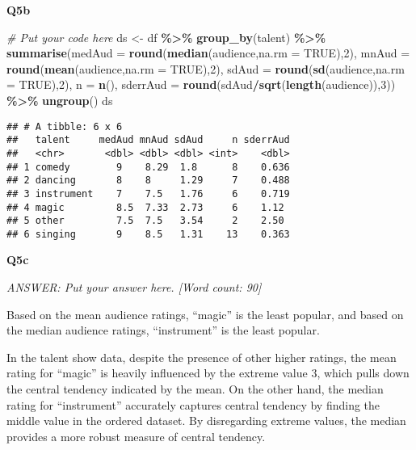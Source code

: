 \documentclass[
]{article}
\newenvironment{Shaded}{\begin{snugshade}}{\end{snugshade}}
\newcommand{\AttributeTok}[1]{\textcolor[rgb]{0.13,0.29,0.53}{#1}}
\newcommand{\CommentTok}[1]{\textcolor[rgb]{0.56,0.35,0.01}{\textit{#1}}}
\newcommand{\ConstantTok}[1]{\textcolor[rgb]{0.56,0.35,0.01}{#1}}
\newcommand{\DecValTok}[1]{\textcolor[rgb]{0.00,0.00,0.81}{#1}}
\newcommand{\FunctionTok}[1]{\textcolor[rgb]{0.13,0.29,0.53}{\textbf{#1}}}
\newcommand{\NormalTok}[1]{#1}
\newcommand{\OtherTok}[1]{\textcolor[rgb]{0.56,0.35,0.01}{#1}}
\newcommand{\SpecialCharTok}[1]{\textcolor[rgb]{0.81,0.36,0.00}{\textbf{#1}}}
\begin{document}
\textbf{Q5b}

\begin{Shaded}
\begin{Highlighting}[]
\CommentTok{\# Put your code here}
\NormalTok{ds }\OtherTok{\textless{}{-}}\NormalTok{ df }\SpecialCharTok{\%\textgreater{}\%}
  \FunctionTok{group\_by}\NormalTok{(talent) }\SpecialCharTok{\%\textgreater{}\%}
  \FunctionTok{summarise}\NormalTok{(}\AttributeTok{medAud =} \FunctionTok{round}\NormalTok{(}\FunctionTok{median}\NormalTok{(audience,}\AttributeTok{na.rm =} \ConstantTok{TRUE}\NormalTok{),}\DecValTok{2}\NormalTok{),}
            \AttributeTok{mnAud =} \FunctionTok{round}\NormalTok{(}\FunctionTok{mean}\NormalTok{(audience,}\AttributeTok{na.rm =} \ConstantTok{TRUE}\NormalTok{),}\DecValTok{2}\NormalTok{),}
            \AttributeTok{sdAud =} \FunctionTok{round}\NormalTok{(}\FunctionTok{sd}\NormalTok{(audience,}\AttributeTok{na.rm =} \ConstantTok{TRUE}\NormalTok{),}\DecValTok{2}\NormalTok{),}
            \AttributeTok{n =} \FunctionTok{n}\NormalTok{(),}
            \AttributeTok{sderrAud =} \FunctionTok{round}\NormalTok{(sdAud}\SpecialCharTok{/}\FunctionTok{sqrt}\NormalTok{(}\FunctionTok{length}\NormalTok{(audience)),}\DecValTok{3}\NormalTok{)) }\SpecialCharTok{\%\textgreater{}\%}
  \FunctionTok{ungroup}\NormalTok{()}
\NormalTok{ds}
\end{Highlighting}
\end{Shaded}

\begin{verbatim}
## # A tibble: 6 x 6
##   talent     medAud mnAud sdAud     n sderrAud
##   <chr>       <dbl> <dbl> <dbl> <int>    <dbl>
## 1 comedy        9    8.29  1.8      8    0.636
## 2 dancing       8    8     1.29     7    0.488
## 3 instrument    7    7.5   1.76     6    0.719
## 4 magic         8.5  7.33  2.73     6    1.12 
## 5 other         7.5  7.5   3.54     2    2.50 
## 6 singing       9    8.5   1.31    13    0.363
\end{verbatim}

\textbf{Q5c}

\emph{ANSWER: Put your answer here. {[}Word count: 90{]}}

Based on the mean audience ratings, ``magic'' is the least popular, and
based on the median audience ratings, ``instrument'' is the least
popular.

In the talent show data, despite the presence of other higher ratings,
the mean rating for ``magic'' is heavily influenced by the extreme value
3, which pulls down the central tendency indicated by the mean. On the
other hand, the median rating for ``instrument'' accurately captures
central tendency by finding the middle value in the ordered dataset. By
disregarding extreme values, the median provides a more robust measure
of central tendency.
\end{document}
